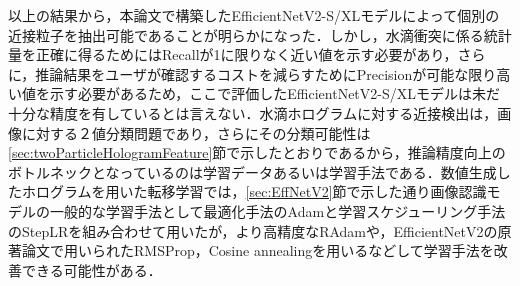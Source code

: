 以上の結果から，本論文で構築したEfficientNetV2-S/XLモデルによって個別の近接粒子を抽出可能であることが明らかになった．しかし，水滴衝突に係る統計量を正確に得るためにはRecallが1に限りなく近い値を示す必要があり，さらに，推論結果をユーザが確認するコストを減らすためにPrecisionが可能な限り高い値を示す必要があるため，ここで評価したEfficientNetV2-S/XLモデルは未だ十分な精度を有しているとは言えない．水滴ホログラムに対する近接検出は，画像に対する２値分類問題であり，さらにその分類可能性は\ref{sec:twoParticleHologramFeature}節で示したとおりであるから，推論精度向上のボトルネックとなっているのは学習データあるいは学習手法である．数値生成したホログラムを用いた転移学習では，\ref{sec:EffNetV2}節で示した通り画像認識モデルの一般的な学習手法として最適化手法のAdamと学習スケジューリング手法のStepLRを組み合わせて用いたが，より高精度なRAdam\cite{liu2020}や，EfficientNetV2の原著論文で用いられたRMSProp\cite{yamashita2018}，Cosine annealing\cite{loshchilov2017}を用いるなどして学習手法を改善できる可能性がある．

